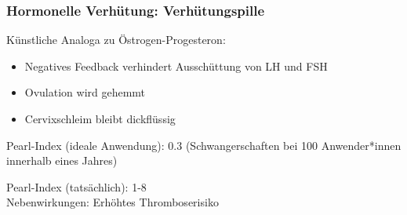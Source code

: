 \documentclass{beamer}
\begin{document}
{
\begin{frame}
\frametitle{Hormonelle Verhütung: Verhütungspille}

Künstliche Analoga zu Östrogen-Progesteron: \\
\begin{itemize}
\item
Negatives Feedback verhindert Ausschüttung von LH und FSH \\
\item
Ovulation wird gehemmt \\
\item
Cervixschleim bleibt dickflüssig \\[0.2 cm]
\end{itemize}

\pause

Pearl-Index (ideale Anwendung): 0.3 (Schwangerschaften bei 100 Anwender*innen innerhalb eines Jahres)\\

\pause

Pearl-Index (tatsächlich): 1-8 \\

Nebenwirkungen: Erhöhtes Thromboserisiko\\[4cm]





\end{frame}
}
\end{document}
